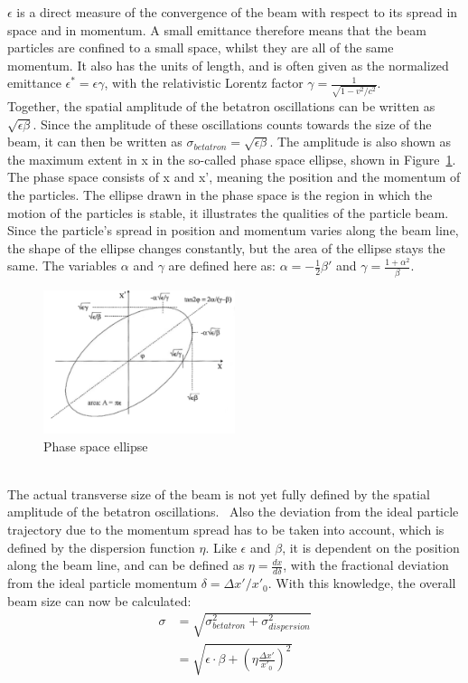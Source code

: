 $\epsilon$ is a direct measure of the convergence of the beam with respect to its spread in space and in momentum.
A small emittance therefore means that the beam particles are confined to a small space, whilst they are all of the same momentum.
It also has the units of length, and is often given as the normalized emittance $\epsilon^* = \epsilon\gamma$, with the relativistic Lorentz factor $\gamma=\frac{1}{\sqrt{1-v^2/c^2}}$.\\
Together, the spatial amplitude of the betatron oscillations can be written as $\sqrt{\epsilon\beta}$.
Since the amplitude of these oscillations counts towards the size of the beam, it can then be written as $\sigma_{betatron} = \sqrt{\epsilon\beta}$.
The amplitude is also shown as the maximum extent in x in the so-called phase space ellipse, shown in Figure~\ref{fig:PhaseSpaceEllipse}.
The phase space consists of x and x', meaning the position and the momentum of the particles.
The ellipse drawn in the phase space is the region in which the motion of the particles is stable, it illustrates the qualities of the particle beam.
Since the particle's spread in position and momentum varies along the beam line, the shape of the ellipse changes constantly, but the area of the ellipse stays the same.
The variables $\alpha$ and $\gamma$ are defined here as: $\alpha = -\frac12\beta'$ and $\gamma = \frac{1+\alpha^2}{\beta}$.~\cite[cf. p. 283ff]{Wangler}
\begin{figure}[h]
\centering
\includegraphics[width=0.5\textwidth]{Figures/PhaseSpaceEllipse_w_AxisTitles.png}
\caption[Phase space ellipse]{Phase space ellipse~\cite[cf. p. 158]{Wiedemann}}
\label{fig:PhaseSpaceEllipse}
\end{figure}
\\The actual transverse size of the beam is not yet fully defined by the spatial amplitude of the betatron oscillations.~\cite[cf. p. 108ff]{Conte}
Also the deviation from the ideal particle trajectory due to the momentum spread has to be taken into account, which is defined by the dispersion function $\eta$.
Like $\epsilon$ and $\beta$, it is dependent on the position along the beam line, and can be defined as $\eta = \frac{dx}{d\delta}$, with the fractional deviation from the ideal particle momentum $\delta = \Delta x'/x'_0$.
With this knowledge, the overall beam size can now be calculated:
\begin{align}
 \sigma&=\sqrt{\sigma^2_{betatron}+\sigma^2_{dispersion}}\\
 &=\sqrt{\epsilon\cdot\beta+\left(\eta\frac{\Delta x'}{x'_0}\right)^2}
\end{align}


